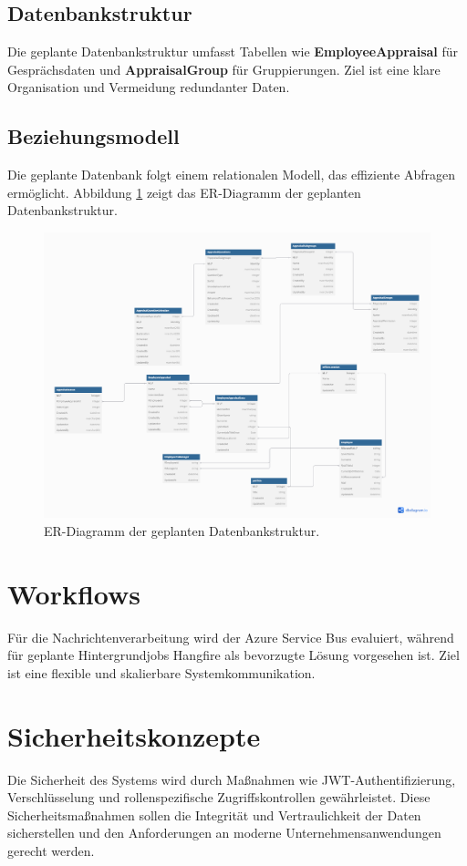 \subsection{Datenbankstruktur}
Die geplante Datenbankstruktur umfasst Tabellen wie \textbf{EmployeeAppraisal} für Gesprächsdaten und \textbf{AppraisalGroup} für Gruppierungen. Ziel ist eine klare Organisation und Vermeidung redundanter Daten.

\subsection{Beziehungsmodell}
Die geplante Datenbank folgt einem relationalen Modell, das effiziente Abfragen ermöglicht. Abbildung \ref{fig:db_er_model} zeigt das ER-Diagramm der geplanten Datenbankstruktur.

\begin{figure}[h!]
    \centering
    \includegraphics[width=1.0\textwidth]{images/er_modell_design.png}
    \caption{ER-Diagramm der geplanten Datenbankstruktur.}
    \label{fig:db_er_model}
\end{figure}

\section{Workflows}
Für die Nachrichtenverarbeitung wird der Azure Service Bus evaluiert, während für geplante Hintergrundjobs Hangfire als bevorzugte Lösung vorgesehen ist. Ziel ist eine flexible und skalierbare Systemkommunikation.

\section{Sicherheitskonzepte}
Die Sicherheit des Systems wird durch Maßnahmen wie JWT-Authentifizierung, Verschlüsselung und rollenspezifische Zugriffskontrollen gewährleistet. Diese Sicherheitsmaßnahmen sollen die Integrität und Vertraulichkeit der Daten sicherstellen und den Anforderungen an moderne Unternehmensanwendungen gerecht werden.
